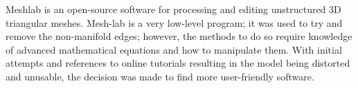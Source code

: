 Meshlab is an open-source software for processing and editing unstructured 3D triangular meshes. Mesh-lab is a very low-level program; it was used to try and remove the non-manifold edges; however, the methods to do so require knowledge of advanced mathematical equations and how to manipulate them. With initial attempts and references to online tutorials resulting in the model being distorted and unusable, the decision was made to find more user-friendly software.


